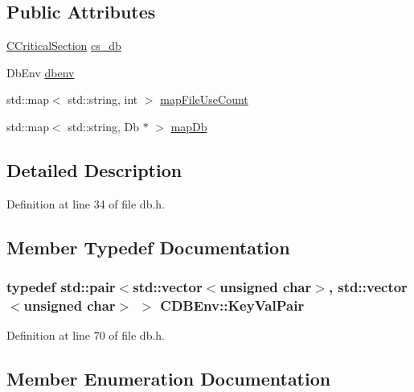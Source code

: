 \subsection*{Public Attributes}
\begin{DoxyCompactItemize}
\item 
\hyperlink{sync_8h_a37a4692b2d517f2843655ca11af7668a}{C\+Critical\+Section} \hyperlink{class_c_d_b_env_af71bf28f9142c38aedc550353270b2b7}{cs\+\_\+db}
\item 
Db\+Env \hyperlink{class_c_d_b_env_a50a70690e7f688f5e92a972e7fa18668}{dbenv}
\item 
std\+::map$<$ std\+::string, int $>$ \hyperlink{class_c_d_b_env_a3b8a3caf48395ef3f05e3717b33bf32c}{map\+File\+Use\+Count}
\item 
std\+::map$<$ std\+::string, Db $\ast$ $>$ \hyperlink{class_c_d_b_env_a89184b6635285b963fa4d80fc292b386}{map\+Db}
\end{DoxyCompactItemize}


\subsection{Detailed Description}


Definition at line 34 of file db.\+h.



\subsection{Member Typedef Documentation}
\hypertarget{class_c_d_b_env_a53fd285f09c312973caa6f90b33937f5}{}
\subsubsection[{Key\+Val\+Pair}]{\setlength{\rightskip}{0pt plus 5cm}typedef std\+::pair$<$std\+::vector$<$unsigned char$>$, std\+::vector$<$unsigned char$>$ $>$ {\bf C\+D\+B\+Env\+::\+Key\+Val\+Pair}}\label{class_c_d_b_env_a53fd285f09c312973caa6f90b33937f5}


Definition at line 70 of file db.\+h.



\subsection{Member Enumeration Documentation}
\hypertarget{class_c_d_b_env_a6fbf26da5d7f8f64a77a3ba15e4df244}{}
